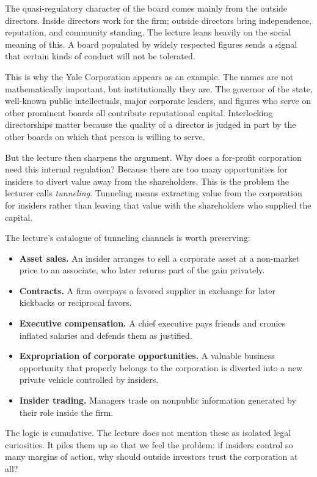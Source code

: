 The quasi-regulatory character of the board comes mainly from the outside directors. Inside directors work for the firm; outside directors bring independence, reputation, and community standing. The lecture leans heavily on the social meaning of this. A board populated by widely respected figures sends a signal that certain kinds of conduct will not be tolerated.

This is why the Yale Corporation appears as an example. The names are not mathematically important, but institutionally they are. The governor of the state, well-known public intellectuals, major corporate leaders, and figures who serve on other prominent boards all contribute reputational capital. Interlocking directorships matter because the quality of a director is judged in part by the other boards on which that person is willing to serve.

But the lecture then sharpens the argument. Why does a for-profit corporation need this internal regulation? Because there are too many opportunities for insiders to divert value away from the shareholders. This is the problem the lecturer calls \emph{tunneling}. Tunneling means extracting value from the corporation for insiders rather than leaving that value with the shareholders who supplied the capital.

The lecture's catalogue of tunneling channels is worth preserving:
\begin{itemize}
\item \textbf{Asset sales.} An insider arranges to sell a corporate asset at a non-market price to an associate, who later returns part of the gain privately.
\item \textbf{Contracts.} A firm overpays a favored supplier in exchange for later kickbacks or reciprocal favors.
\item \textbf{Executive compensation.} A chief executive pays friends and cronies inflated salaries and defends them as justified.
\item \textbf{Expropriation of corporate opportunities.} A valuable business opportunity that properly belongs to the corporation is diverted into a new private vehicle controlled by insiders.
\item \textbf{Insider trading.} Managers trade on nonpublic information generated by their role inside the firm.
\end{itemize}

The logic is cumulative. The lecture does not mention these as isolated legal curiosities. It piles them up so that we feel the problem: if insiders control so many margins of action, why should outside investors trust the corporation at all?

